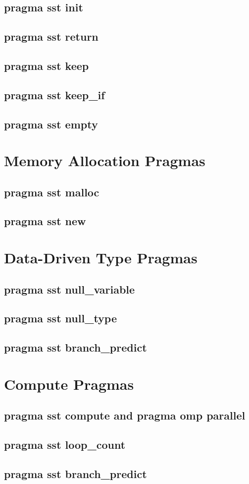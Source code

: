 \subsection{pragma sst init}
\subsection{pragma sst return}
\subsection{pragma sst keep}
\subsection{pragma sst keep\_if}
\subsection{pragma sst empty}

\section{Memory Allocation Pragmas}
\subsection{pragma sst malloc}
\subsection{pragma sst new}

\section{Data-Driven Type Pragmas}
\subsection{pragma sst null\_variable}
\subsection{pragma sst null\_type}
\subsection{pragma sst branch\_predict}

\section{Compute Pragmas}
\subsection{pragma sst compute and pragma omp parallel}
\subsection{pragma sst loop\_count}
\subsection{pragma sst branch\_predict}